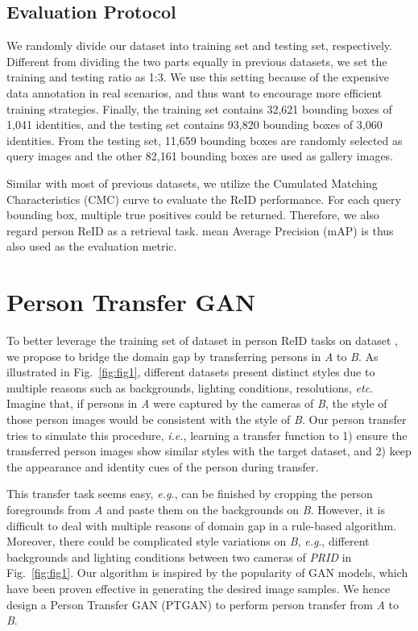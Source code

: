 \documentclass[10pt,twocolumn,letterpaper]{article}
\begin{document}
\subsection{Evaluation Protocol}
\label{sec:evaluationProtocol}

We randomly divide our dataset into training set and testing set, respectively. Different from dividing the two parts equally in previous datasets, we set the training and testing ratio as 1:3. We use this setting because of the expensive data annotation in real scenarios, and thus want to encourage more efficient training strategies. Finally, the training set contains 32,621 bounding boxes of 1,041 identities, and the testing set contains 93,820 bounding boxes of 3,060 identities. From the testing set, 11,659 bounding boxes are randomly selected as query images and the other 82,161 bounding boxes are used as gallery images.

Similar with most of previous datasets, we utilize the Cumulated Matching Characteristics (CMC) curve to evaluate the ReID performance. For each query bounding box, multiple true positives could be returned. Therefore, we also regard person ReID as a retrieval task. mean Average Precision (mAP) is thus also used as the evaluation metric.

\section{Person Transfer GAN}

To better leverage the training set of dataset  in person ReID tasks on dataset , we propose to bridge the domain gap by transferring persons in \emph{A} to \emph{B}. As illustrated in Fig.~\ref{fig:fig1}, different datasets present distinct styles due to multiple reasons such as backgrounds, lighting conditions, resolutions, \emph{etc}. Imagine that, if persons in \emph{A} were captured by the cameras of \emph{B}, the style of those person images would be consistent with the style of \emph{B}. Our person transfer tries to simulate this procedure, \emph{i.e.}, learning a transfer function to 1) ensure the transferred person images show similar styles with the target dataset, and 2) keep the appearance and identity cues of the person during transfer.

This transfer task seems easy, \emph{e.g.}, can be finished by cropping the person foregrounds from \emph{A} and paste them on the backgrounds on \emph{B}. However, it is difficult to deal with multiple reasons of domain gap in a rule-based algorithm. Moreover, there could be complicated style variations on \emph{B}, \emph{e.g}., different backgrounds and lighting conditions between two cameras of \emph{PRID} in Fig.~\ref{fig:fig1}. Our algorithm is inspired by the popularity of GAN models, which have been proven effective in generating the desired image samples. We hence design a Person Transfer GAN (PTGAN) to perform person transfer from \emph{A} to \emph{B}.
\end{document}
